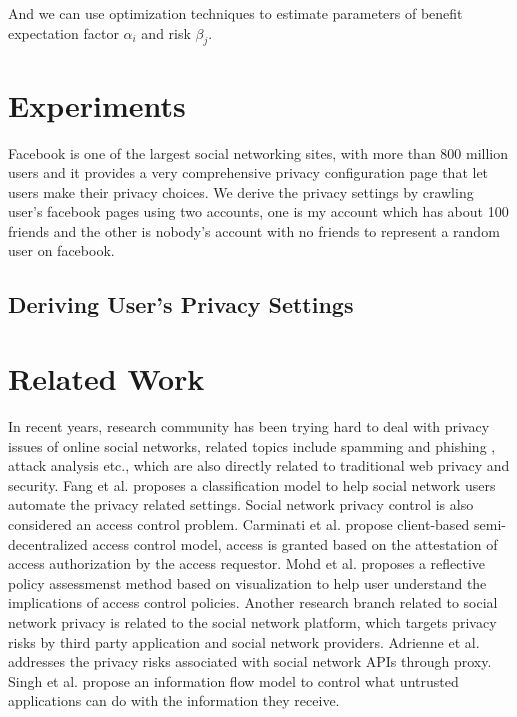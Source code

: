 \documentclass[a4paper]{article}
\begin{document}
And we can use optimization techniques to estimate parameters of
benefit expectation factor $\alpha_i$ and risk $\beta_j$.

\section{Experiments}
Facebook is one of the largest social networking sites, with more than
800 million users\cite{facebookwiki} and it provides a very
comprehensive privacy configuration page that let users make their
privacy choices. We derive the privacy settings by crawling user's
facebook pages using two accounts, one is my account which has about 100
friends and the other is nobody's account with no friends to represent
a random user on facebook.

\subsection{Deriving User's Privacy Settings}

\section{Related Work}

In recent years, research community has been trying hard to deal with
privacy issues of online social networks, related topics include
spamming and phishing \cite{twitter-spam, SN-explore-spam,
SN-automated-cheap-spam, social-spam-detection, video-spam-youtube},
attack analysis \cite{neighborhood-attack, 1658958,
group-deanonymization-attack, anony-link-attack,
identity-theft-attack, sybil-attack, 1608132} etc., which are also
directly related to traditional web privacy and security. Fang et
al. \cite{privacy-wizard} proposes a classification model to help
social network users automate the privacy related settings. Social
network privacy control is also considered an access control
problem. Carminati et al. \cite{crypto-collaborative-ac,
rule-based-ac} propose client-based semi-decentralized access control
model, access is granted based on the attestation of access
authorization by the access requestor. Mohd et
al. \cite{Anwar_visualizingprivacy} proposes a reflective policy
assessmenst method based on visualization to help user understand the
implications of access control policies. Another research branch
related to social network privacy is related to the social network
platform, which targets privacy risks by third party application and
social network providers. Adrienne et
al. \cite{Felt08privacyprotection} addresses the privacy risks
associated with social network APIs through proxy. Singh et
al. \cite{xbook-social-platform} propose an information flow model to
control what untrusted applications can do with the information they
receive.
\end{document}
